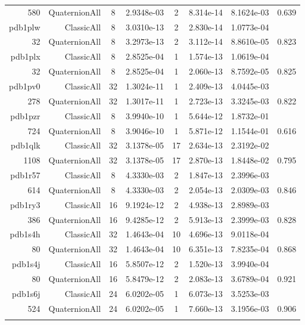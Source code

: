 \begin{xltabular}{\textwidth}{r|rcS[table-format=1.4e+2]cS[table-format=1.3e+2]S[table-format=1.4e+2]S[table-format=-1.3]}
580 & QuaternionAll & 8 & 2.9348e-03 & 2 & 8.314e-14 & 8.1624e-03 & 0.639\\  \addlinespace
pdb1plw & ClassicAll & 8 & 3.0310e-13 & 2 & 2.830e-14 & 1.0773e-04 & \\
32 & QuaternionAll & 8 & 3.2973e-13 & 2 & 3.112e-14 & 8.8610e-05 & 0.823\\  \addlinespace
pdb1plx & ClassicAll & 8 & 2.8525e-04 & 1 & 1.574e-13 & 1.0619e-04 & \\
32 & QuaternionAll & 8 & 2.8525e-04 & 1 & 2.060e-13 & 8.7592e-05 & 0.825\\  \addlinespace
pdb1pv0 & ClassicAll & 32 & 1.3024e-11 & 1 & 2.409e-13 & 4.0445e-03 & \\
278 & QuaternionAll & 32 & 1.3017e-11 & 1 & 2.723e-13 & 3.3245e-03 & 0.822\\  \addlinespace
{\color{red} pdb1pzr } & ClassicAll & 8 & 3.9940e-10 & 1 & 5.644e-12 & 1.8732e-01 & \\
724 & QuaternionAll & 8 & 3.9046e-10 & 1 & 5.871e-12 & 1.1544e-01 & 0.616\\  \addlinespace
pdb1qlk & ClassicAll & 32 & 3.1378e-05 & 17 & 2.634e-13 & 2.3192e-02 & \\
1108 & QuaternionAll & 32 & 3.1378e-05 & 17 & 2.870e-13 & 1.8448e-02 & 0.795\\  \addlinespace
pdb1r57 & ClassicAll & 8 & 4.3330e-03 & 2 & 1.847e-13 & 2.3996e-03 & \\
614 & QuaternionAll & 8 & 4.3330e-03 & 2 & 2.054e-13 & 2.0309e-03 & 0.846\\  \addlinespace
pdb1ry3 & ClassicAll & 16 & 9.1924e-12 & 2 & 4.938e-13 & 2.8989e-03 & \\
386 & QuaternionAll & 16 & 9.4285e-12 & 2 & 5.913e-13 & 2.3999e-03 & 0.828\\  \addlinespace
pdb1s4h & ClassicAll & 32 & 1.4643e-04 & 10 & 4.696e-13 & 9.0118e-04 & \\
80 & QuaternionAll & 32 & 1.4643e-04 & 10 & 6.351e-13 & 7.8235e-04 & 0.868\\  \addlinespace
pdb1s4j & ClassicAll & 16 & 5.8507e-12 & 2 & 1.520e-13 & 3.9940e-04 & \\
80 & QuaternionAll & 16 & 5.8479e-12 & 2 & 2.083e-13 & 3.6789e-04 & 0.921\\  \addlinespace
pdb1s6j & ClassicAll & 24 & 6.0202e-05 & 1 & 6.073e-13 & 3.5253e-03 & \\
524 & QuaternionAll & 24 & 6.0202e-05 & 1 & 7.660e-13 & 3.1956e-03 & 0.906\\  \addlinespace

\end{xltabular}
